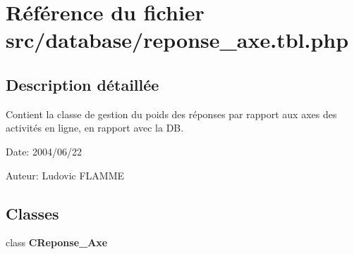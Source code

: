 \section{Référence du fichier src/database/reponse\_\-axe.tbl.php}
\label{reponse__axe_8tbl_8php}


\subsection{Description détaillée}
Contient la classe de gestion du poids des réponses par rapport aux axes des activités en ligne, en rapport avec la DB. 

\begin{Desc}
\item[Date:]2004/06/22\end{Desc}
\begin{Desc}
\item[Auteur:]Ludovic FLAMME \end{Desc}


\subsection*{Classes}
\begin{CompactItemize}
\item 
class \textbf{CReponse\_\-Axe}
\end{CompactItemize}

